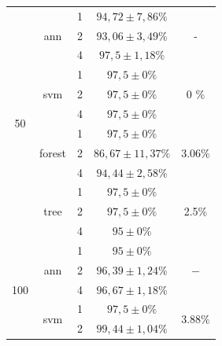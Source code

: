 \begin{table}[]
\begin{tabular}{|c|c|c|c|c|}
\multirow{12}{*}{50}  & \multirow{3}{*}{ann}    & 1                & $ 94,72 \pm 7,86 \% $   & \multirow{3}{*}{-} \\ \cline{3-4} 
                      &                         & 2                & $ 93,06 \pm 3,49 \% $  & \\ \cline{3-4} 
                      &                         & 4                & $ 97,5 \pm 1,18 \% $    &\\ \cline{2-5} 
                      & \multirow{3}{*}{svm}    & 1                & $ 97,5 \pm 0 \% $       & \multirow{3}{*}{0 \%} \\ \cline{3-4} 
                      &                         & 2                & $ 97,5 \pm 0 \% $     &  \\ \cline{3-4} 
                      &                         & 4                & $ 97,5 \pm 0 \% $       & \\ \cline{2-5} 
                      & \multirow{3}{*}{forest} & 1                & $ 97,5 \pm 0 \% $       & \multirow{3}{*}{3.06\%} \\ \cline{3-4} 
                      &                         & 2                & $ 86,67 \pm 11,37 \% $ & \\ \cline{3-4} 
                      &                         & 4                & $ 94,44 \pm 2,58 \% $   &\\ \cline{2-5} 
                      & \multirow{3}{*}{tree}   & 1                & $ 97,5 \pm 0 \% $       & \multirow{3}{*}{2.5\%} \\ \cline{3-4} 
                      &                         & 2                & $ 97,5 \pm 0 \% $      & \\ \cline{3-4} 
                      &                         & 4                & $ 95 \pm 0 \%   $      &\\ \hline
\multirow{12}{*}{100} & \multirow{3}{*}{ann}    & 1                & $ 95 \pm 0 \%   $      & \multirow{3}{*}{$-$} \\ \cline{3-4} 
                      &                         & 2                & $ 96,39 \pm 1,24 \% $   &\\ \cline{3-4} 
                      &                         & 4                & $ 96,67 \pm 1,18 \% $  & \\ \cline{2-5} 
                      & \multirow{3}{*}{svm}    & 1                & $ 97,5 \pm 0 \% $       & \multirow{3}{*}{3.88\%} \\ \cline{3-4} 
                      &                         & 2                & $ 99,44 \pm 1,04 \% $  & \\ \cline{3-4} 

\end{tabular}
\end{table}
